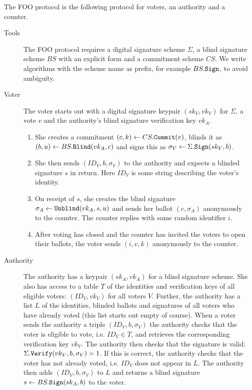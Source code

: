 \documentclass{llncs}
\newcommand{\alg}[1]{\textup{\texttt{#1}}}
\begin{document}
\begin{definition}
The FOO protocol is the following protocol for voters, an authority and a counter.
\end{definition}

\begin{description}
\item[Tools] The FOO protocol requires a digital signature scheme $\Sigma$, a
blind signature scheme $BS$ with an explicit form and a commitment scheme $CS$.
We write algorithms with the scheme name as prefix, for example $BS.\alg{Sign}$,
to avoid ambiguity.

\item[Voter] The voter starts out with a digital signature keypair $(sk_V,
vk_V)$ for $\Sigma$, a vote $v$ and the authority's blind signature
verification key $vk_A$.
\begin{enumerate}
\item She creates a commitment $(c, k) \gets CS.\alg{Commit}(v)$, blinds it as
$(b, u) \gets BS.\alg{Blind}(vk_A, c)$ and signs this as $\sigma_V \gets
\Sigma.\alg{Sign}(sk_V, b)$.
\item She then sends $(ID_V, b, \sigma_V)$ to the authority and expects a
blinded signature $s$ in return. Here $ID_V$ is some string describing the
voter's identity.
\item On receipt of $s$, she creates the blind signature $\sigma_A \gets \alg{Unblind}(vk_A, s, u)$ and sends her ballot $(c, \sigma_A)$ anonymously to the counter. The counter replies with some random identifier $i$.
\item After voting has closed and the counter has invited the voters to open
their ballots, the voter sends $(i, v, k)$ anonymously to the counter.
\end{enumerate}

\item[Authority]
The authority has a keypair $(sk_A, vk_A)$ for a blind signature scheme. She
also has access to a table $T$ of the identities and verification keys of all
eligible voters: $(ID_V, vk_V)$ for all voters $V$.
Further, the authority has a list $L$ of the identities, blinded ballots
and signatures of all voters who have already voted (this list starts out empty
of course).
When a voter sends the authority a triple $(ID_V, b, \sigma_V)$ the
authority checks that the voter is eligible to vote, i.e. $ID_V \in T$, and retrieves the corresponding verification key $vk_V$.
The authority then checks that the signature is valid: $\Sigma.\alg{Verify}(vk_V, b, \sigma_V) = 1$. If this is correct, the authority checks that the voter has not already voted, i.e. $ID_V$ does not appear in $L$.
The authority then adds $(ID_V, b, \sigma_V)$ to $L$ and returns a blind
signature $s \gets BS.\alg{Sign}(sk_A, b)$ to the voter.


\end{description}
\end{document}
